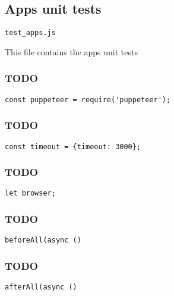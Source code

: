 \documentclass[a4paper]{article}
\begin{document}
\subsection{Apps unit tests}

\begin{lstlisting}
test_apps.js
\end{lstlisting}

This file contains the apps unit tests

\hypertarget{toc456}{}
\subsubsection{TODO}

\begin{lstlisting}
const puppeteer = require('puppeteer');
\end{lstlisting}

\hypertarget{toc457}{}
\subsubsection{TODO}

\begin{lstlisting}
const timeout = {timeout: 3000};
\end{lstlisting}

\hypertarget{toc458}{}
\subsubsection{TODO}

\begin{lstlisting}
let browser;
\end{lstlisting}

\hypertarget{toc459}{}
\subsubsection{TODO}

\begin{lstlisting}
beforeAll(async ()
\end{lstlisting}

\hypertarget{toc460}{}
\subsubsection{TODO}

\begin{lstlisting}
afterAll(async ()
\end{lstlisting}
\end{document}
